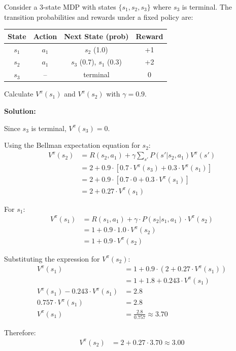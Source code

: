 \begin{examplebox}
Consider a 3-state MDP with states $\{s_1, s_2, s_3\}$ where $s_3$ is terminal. The transition probabilities and rewards under a fixed policy are:

\begin{center}
\begin{tabular}{cccc}
\toprule
State & Action & Next State (prob) & Reward \\
\midrule
$s_1$ & $a_1$ & $s_2$ (1.0) & +1 \\
$s_2$ & $a_1$ & $s_3$ (0.7), $s_1$ (0.3) & +2 \\
$s_3$ & -- & terminal & 0 \\
\bottomrule
\end{tabular}
\end{center}

Calculate $V^\pi(s_1)$ and $V^\pi(s_2)$ with $\gamma = 0.9$.

\textbf{Solution:}

Since $s_3$ is terminal, $V^\pi(s_3) = 0$.

Using the Bellman expectation equation for $s_2$:
\begin{align}
V^\pi(s_2) &= R(s_2, a_1) + \gamma \sum_{s'} P(s'|s_2, a_1) V^\pi(s') \\
&= 2 + 0.9 \cdot [0.7 \cdot V^\pi(s_3) + 0.3 \cdot V^\pi(s_1)] \\
&= 2 + 0.9 \cdot [0.7 \cdot 0 + 0.3 \cdot V^\pi(s_1)] \\
&= 2 + 0.27 \cdot V^\pi(s_1)
\end{align}

For $s_1$:
\begin{align}
V^\pi(s_1) &= R(s_1, a_1) + \gamma \cdot P(s_2|s_1, a_1) \cdot V^\pi(s_2) \\
&= 1 + 0.9 \cdot 1.0 \cdot V^\pi(s_2) \\
&= 1 + 0.9 \cdot V^\pi(s_2)
\end{align}

Substituting the expression for $V^\pi(s_2)$:
\begin{align}
V^\pi(s_1) &= 1 + 0.9 \cdot (2 + 0.27 \cdot V^\pi(s_1)) \\
&= 1 + 1.8 + 0.243 \cdot V^\pi(s_1) \\
V^\pi(s_1) - 0.243 \cdot V^\pi(s_1) &= 2.8 \\
0.757 \cdot V^\pi(s_1) &= 2.8 \\
V^\pi(s_1) &= \frac{2.8}{0.757} \approx \boxed{3.70}
\end{align}

Therefore:
\begin{align}
V^\pi(s_2) &= 2 + 0.27 \cdot 3.70 \approx \boxed{3.00}
\end{align}
\end{examplebox}

